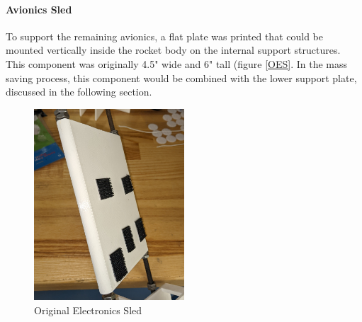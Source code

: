 \paragraph{Avionics Sled}
To support the remaining avionics, a flat plate was printed that could be mounted vertically inside the rocket body on the internal support structures. This component was originally 4.5" wide and 6" tall (figure \ref{OES}. In the mass saving process, this component would be combined with the lower support plate, discussed in the following section. 

\begin{figure}[H]
    \centering
    \includegraphics[width=0.5\textwidth]{src/figs/OldElectronicSled.jpg}
    \caption{Original Electronics Sled}
    \label{fig:OES}
\end{figure}


